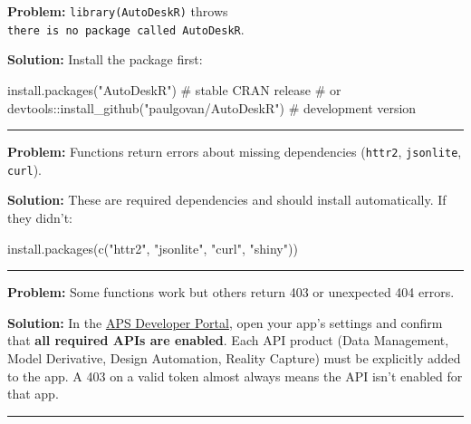 \documentclass[
  11pt,
  letterpaper,
  DIV=11,
  numbers=noendperiod]{scrreprt}
\newenvironment{Shaded}{\begin{snugshade}}{\end{snugshade}}
\newcommand{\CommentTok}[1]{\textcolor[rgb]{0.37,0.37,0.37}{#1}}
\newcommand{\FunctionTok}[1]{\textcolor[rgb]{0.28,0.35,0.67}{#1}}
\newcommand{\NormalTok}[1]{\textcolor[rgb]{0.00,0.23,0.31}{#1}}
\newcommand{\SpecialCharTok}[1]{\textcolor[rgb]{0.37,0.37,0.37}{#1}}
\newcommand{\StringTok}[1]{\textcolor[rgb]{0.13,0.47,0.30}{#1}}
\begin{document}
\textbf{Problem:} \texttt{library(AutoDeskR)} throws
\texttt{there\ is\ no\ package\ called\ \textquotesingle{}AutoDeskR\textquotesingle{}}.

\textbf{Solution:} Install the package first:

\begin{Shaded}
\begin{Highlighting}[]
\FunctionTok{install.packages}\NormalTok{(}\StringTok{"AutoDeskR"}\NormalTok{)         }\CommentTok{\# stable CRAN release}
\CommentTok{\# or}
\NormalTok{devtools}\SpecialCharTok{::}\FunctionTok{install\_github}\NormalTok{(}\StringTok{"paulgovan/AutoDeskR"}\NormalTok{)  }\CommentTok{\# development version}
\end{Highlighting}
\end{Shaded}

\begin{center}\rule{0.5\linewidth}{0.5pt}\end{center}

\textbf{Problem:} Functions return errors about missing dependencies
(\texttt{httr2}, \texttt{jsonlite}, \texttt{curl}).

\textbf{Solution:} These are required dependencies and should install
automatically. If they didn't:

\begin{Shaded}
\begin{Highlighting}[]
\FunctionTok{install.packages}\NormalTok{(}\FunctionTok{c}\NormalTok{(}\StringTok{"httr2"}\NormalTok{, }\StringTok{"jsonlite"}\NormalTok{, }\StringTok{"curl"}\NormalTok{, }\StringTok{"shiny"}\NormalTok{))}
\end{Highlighting}
\end{Shaded}

\begin{center}\rule{0.5\linewidth}{0.5pt}\end{center}

\textbf{Problem:} Some functions work but others return 403 or
unexpected 404 errors.

\textbf{Solution:} In the \href{https://aps.autodesk.com}{APS Developer
Portal}, open your app's settings and confirm that \textbf{all required
APIs are enabled}. Each API product (Data Management, Model Derivative,
Design Automation, Reality Capture) must be explicitly added to the app.
A 403 on a valid token almost always means the API isn't enabled for
that app.

\begin{center}\rule{0.5\linewidth}{0.5pt}\end{center}
\end{document}
